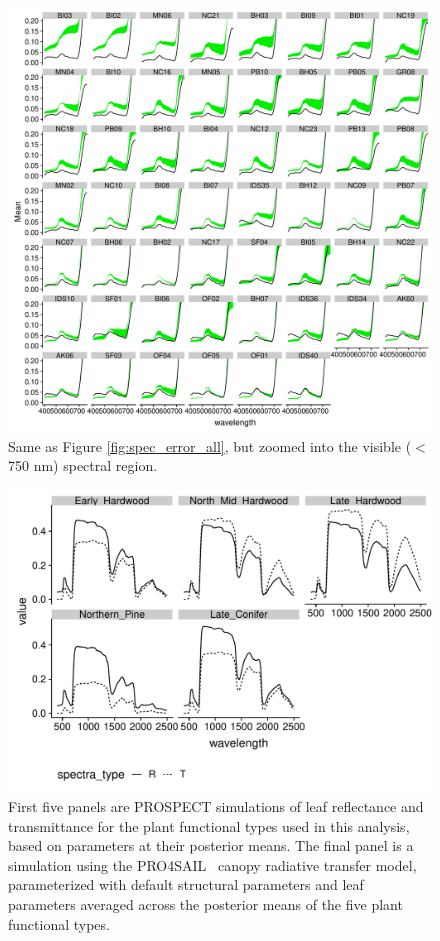 \begin{figure}
  \centering
  \includegraphics[width=\textwidth]{4_edr/figures/explore_spectra/errors_byvis_vis.pdf}
  \caption{%
    Same as Figure \ref{fig:spec_error_all}, but zoomed into the visible ($<$750 nm) spectral region.
  }\label{fig:spec_error_vis}
\end{figure}

\begin{figure}
  \centering
  \includegraphics[width=\textwidth]{4_edr/figures/explore_spectra/pft_prospect_sim.pdf}
  \caption{%
    First five panels are PROSPECT simulations of leaf reflectance and transmittance for the plant functional types used in this analysis, based on parameters at their posterior means.
    The final panel is a simulation using the PRO4SAIL~\cite{verhoef_1984_sail} canopy radiative transfer model, parameterized with default structural parameters and leaf parameters averaged across the posterior means of the five plant functional types.
  }\label{fig:prospect_posterior}
\end{figure}

